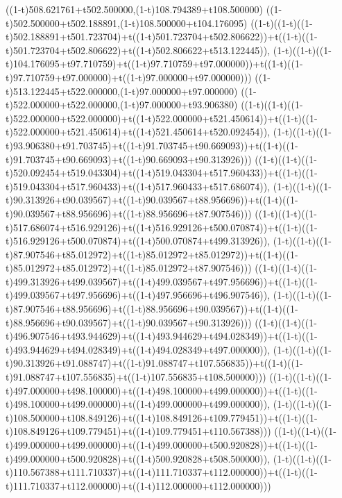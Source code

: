 ((1-t)508.621761+t502.500000,(1-t)108.794389+t108.500000)
((1-t)502.500000+t502.188891,(1-t)108.500000+t104.176095)
((1-t)((1-t)((1-t)502.188891+t501.723704)+t((1-t)501.723704+t502.806622))+t((1-t)((1-t)501.723704+t502.806622)+t((1-t)502.806622+t513.122445)),                                     (1-t)((1-t)((1-t)104.176095+t97.710759)+t((1-t)97.710759+t97.000000))+t((1-t)((1-t)97.710759+t97.000000)+t((1-t)97.000000+t97.000000)))
((1-t)513.122445+t522.000000,(1-t)97.000000+t97.000000)
((1-t)522.000000+t522.000000,(1-t)97.000000+t93.906380)
((1-t)((1-t)((1-t)522.000000+t522.000000)+t((1-t)522.000000+t521.450614))+t((1-t)((1-t)522.000000+t521.450614)+t((1-t)521.450614+t520.092454)),                                     (1-t)((1-t)((1-t)93.906380+t91.703745)+t((1-t)91.703745+t90.669093))+t((1-t)((1-t)91.703745+t90.669093)+t((1-t)90.669093+t90.313926)))
((1-t)((1-t)((1-t)520.092454+t519.043304)+t((1-t)519.043304+t517.960433))+t((1-t)((1-t)519.043304+t517.960433)+t((1-t)517.960433+t517.686074)),                                     (1-t)((1-t)((1-t)90.313926+t90.039567)+t((1-t)90.039567+t88.956696))+t((1-t)((1-t)90.039567+t88.956696)+t((1-t)88.956696+t87.907546)))
((1-t)((1-t)((1-t)517.686074+t516.929126)+t((1-t)516.929126+t500.070874))+t((1-t)((1-t)516.929126+t500.070874)+t((1-t)500.070874+t499.313926)),                                     (1-t)((1-t)((1-t)87.907546+t85.012972)+t((1-t)85.012972+t85.012972))+t((1-t)((1-t)85.012972+t85.012972)+t((1-t)85.012972+t87.907546)))
((1-t)((1-t)((1-t)499.313926+t499.039567)+t((1-t)499.039567+t497.956696))+t((1-t)((1-t)499.039567+t497.956696)+t((1-t)497.956696+t496.907546)),                                     (1-t)((1-t)((1-t)87.907546+t88.956696)+t((1-t)88.956696+t90.039567))+t((1-t)((1-t)88.956696+t90.039567)+t((1-t)90.039567+t90.313926)))
((1-t)((1-t)((1-t)496.907546+t493.944629)+t((1-t)493.944629+t494.028349))+t((1-t)((1-t)493.944629+t494.028349)+t((1-t)494.028349+t497.000000)),                                     (1-t)((1-t)((1-t)90.313926+t91.088747)+t((1-t)91.088747+t107.556835))+t((1-t)((1-t)91.088747+t107.556835)+t((1-t)107.556835+t108.500000)))
((1-t)((1-t)((1-t)497.000000+t498.100000)+t((1-t)498.100000+t499.000000))+t((1-t)((1-t)498.100000+t499.000000)+t((1-t)499.000000+t499.000000)),                                     (1-t)((1-t)((1-t)108.500000+t108.849126)+t((1-t)108.849126+t109.779451))+t((1-t)((1-t)108.849126+t109.779451)+t((1-t)109.779451+t110.567388)))
((1-t)((1-t)((1-t)499.000000+t499.000000)+t((1-t)499.000000+t500.920828))+t((1-t)((1-t)499.000000+t500.920828)+t((1-t)500.920828+t508.500000)),                                     (1-t)((1-t)((1-t)110.567388+t111.710337)+t((1-t)111.710337+t112.000000))+t((1-t)((1-t)111.710337+t112.000000)+t((1-t)112.000000+t112.000000)))
